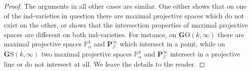 \documentclass[12pt]{amsart}
\theoremstyle{definition}
\begin{document}
\begin{proof}
The arguments in all other cases are similar. One either shows that on one of the ind-varieties in question there are
maximal projective spaces which do not exist on the other, or shows that the intersection properties of maximal
projective spaces are different on both ind-varieties. For instance, on $\mathbf{G}\mathrm{O}(k,\infty)$ there are
maximal projective spaces $\mathbb{P}^k_{\alpha}$ and $\mathbf{P}^{\infty}_{\beta}$ which intersect in a point, while on
$\mathbf{G}\mathrm{S}(k,\infty)$ two maximal projective spaces  $\mathbb{P}^k_{\alpha}$ and
$\mathbf{P}^{\infty}_{\beta}$ intersect in a projective line or do not intersect at all. We leave the details to the
reader.

\end{proof}



\vspace{1cm}
\end{document}
